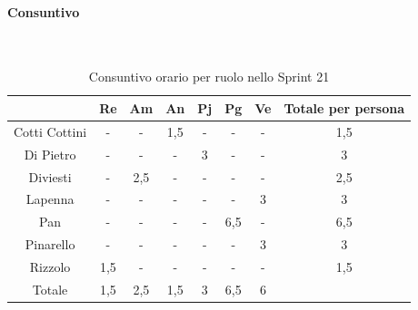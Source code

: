 \documentclass{article}
\begin{document}
            \paragraph{Consuntivo}\mbox{}\\
            \begin{table}[H]
                \centering
                \begin{tabular}{|c|c|c|c|c|c|c|c|}
                \hline
                              & Re  & Am  & An  & Pj  & Pg  & Ve  & Totale per persona \\ \hline
                Cotti Cottini & -   & -   & 1,5 & -   & -   & -   & 1,5                \\ \hline
                Di Pietro     & -   & -   & -   & 3   & -   & -   & 3                  \\ \hline
                Diviesti      & -   & 2,5 & -   & -   & -   & -   & 2,5                \\ \hline
                Lapenna       & -   & -   & -   & -   & -   & 3   & 3                  \\ \hline
                Pan           & -   & -   & -   & -   & 6,5 & -   & 6,5                \\ \hline
                Pinarello     & -   & -   & -   & -   & -   & 3   & 3                  \\ \hline
                Rizzolo       & 1,5 & -   & -   & -   & -   & -   & 1,5                \\ \hline
                Totale        & 1,5 & 2,5 & 1,5 & 3   & 6,5 & 6   &                    \\ \hline
                \end{tabular}
                \caption{Consuntivo orario per ruolo nello Sprint 21}
            \end{table}

\end{document}
